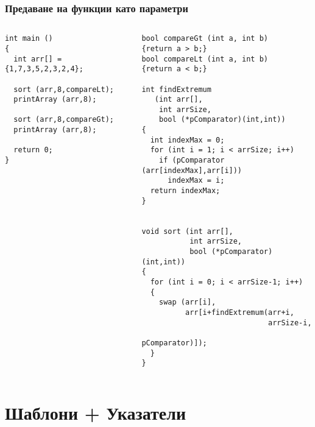 \documentclass{beamer}
\begin{document}
\begin{frame}[fragile]
\frametitle{Предаване на функции като параметри}



\vspace{-20px}

\begin{columns}[t]
  \begin{column}{0.5\textwidth}
\begin{flushleft}
\begin{lstlisting}
int main ()
{
  int arr[] = {1,7,3,5,2,3,2,4};

  sort (arr,8,compareLt);
  printArray (arr,8);

  sort (arr,8,compareGt);
  printArray (arr,8);

  return 0;
}
\end{lstlisting}  
\end{flushleft}
  \end{column}
  \begin{column}{0.5\textwidth}
\begin{flushleft}
\begin{lstlisting}
bool compareGt (int a, int b)
{return a > b;}
bool compareLt (int a, int b)
{return a < b;}

int findExtremum 
   (int arr[], 
    int arrSize, 
    bool (*pComparator)(int,int))
{
  int indexMax = 0;
  for (int i = 1; i < arrSize; i++)
    if (pComparator (arr[indexMax],arr[i]))
      indexMax = i;
  return indexMax;
}


void sort (int arr[], 
           int arrSize,
           bool (*pComparator)(int,int))
{
  for (int i = 0; i < arrSize-1; i++)
  {
    swap (arr[i],
          arr[i+findExtremum(arr+i,
                             arrSize-i,
                             pComparator)]);
  }
}
\end{lstlisting}  
\end{flushleft}
  \end{column}
\end{columns}


\end{frame}










\section{Шаблони + Указатели} 
\end{document}
